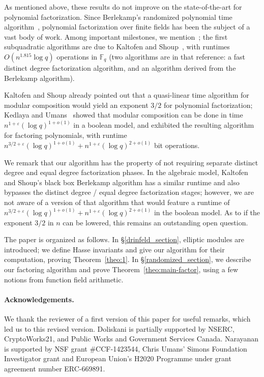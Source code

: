 \documentclass[12pt]{article}
\def\F{\ensuremath{\mathbb{F}}}
\begin{document}
As mentioned above, these results do not improve on the
state-of-the-art for polynomial factorization.
Since Berlekamp's randomized polynomial time algorithm~\cite{ber},
polynomial factorization over finite fields has been the subject of a
vast body of work. Among important milestones, we
mention~\cite{cz,gs}; the first subquadratic algorithms are due to
Kaltofen and Shoup~\cite{ks}, with runtimes $O(n^{1.815}\log q)$
operations in $\F_q$  (two algorithms are in that reference:
a fast distinct degree factorization algorithm, and an algorithm
derived from the Berlekamp algorithm).

Kaltofen and Shoup already pointed out that a quasi-linear time
algorithm for modular composition would yield an exponent $3/2$ for
polynomial factorization; Kedlaya and Umans~\cite{ku} showed that
modular composition can be done in time $n^{1+\varepsilon} (\log
q)^{1+o(1)}$ in a boolean model, and exhibited the resulting
algorithm for factoring polynomials, with runtime $n^{3/2+\varepsilon}
(\log q)^{1 +o(1)} + n^{1+\varepsilon}(\log q)^{2+o(1)}$ bit
operations. 

We remark that our algorithm has the property of not requiring
separate distinct degree and equal degree factorization phases. In the
algebraic model, Kaltofen and Shoup's black box Berlekamp algorithm
has a similar runtime and also bypasses the distinct degree / equal
degree factorization stages; however, we are not aware of a version of
that algorithm that would feature a runtime of $n^{3/2+\varepsilon} (\log q)^{1 +o(1)} +
n^{1+\varepsilon}(\log q)^{2+o(1)}$ in the boolean model.
As to if the exponent $3/2$ in $n$ can be lowered, this remains an
outstanding open question.


The paper is organized as follows. In \S\ref{drinfeld_section},
elliptic modules are introduced; we define Hasse invariants and give
our algorithm for their computation, proving Theorem~\ref{theo:1}.  In
\S\ref{randomized_section}, we describe our factoring algorithm and
prove Theorem~\ref{theo:main-factor}, using a few notions from
function field arithmetic.

 \paragraph*{Acknowledgements.} We thank the reviewer of a first version
of this paper for useful remarks, which led us to this revised version. 
Doliskani is partially supported by NSERC, CryptoWorks21, and Public
Works and Government Services Canada. Narayanan is supported by NSF
grant \#CCF-1423544, Chris Umans' Simons Foundation Investigator grant
and European Union's H2020 Programme under grant agreement number
ERC-669891.
\end{document}
